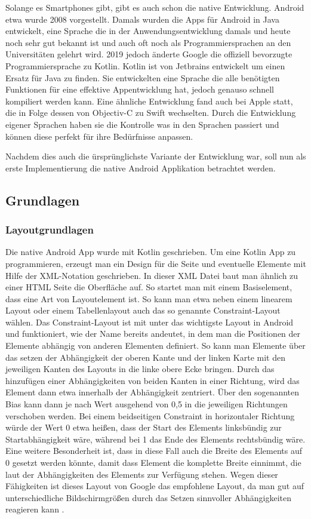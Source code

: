 Solange es Smartphones gibt, gibt es auch schon die native Entwicklung. Android etwa wurde 2008 vorgestellt. Damals wurden die Apps für Android in Java entwickelt, eine Sprache die in der Anwendungsentwicklung damals und heute noch sehr gut bekannt ist und auch oft noch als Programmiersprachen an den Universitäten gelehrt wird. 2019 jedoch änderte Google die offiziell bevorzugte Programmiersprache zu Kotlin. Kotlin ist von Jetbrains entwickelt um einen Ersatz für Java zu finden. Sie entwickelten eine Sprache die alle benötigten Funktionen für eine effektive Appentwicklung hat, jedoch genauso schnell kompiliert werden kann. Eine ähnliche Entwicklung fand auch bei Apple statt, die in Folge dessen von Objectiv-C zu Swift wechselten. Durch die Entwicklung eigener Sprachen haben sie die Kontrolle was in den Sprachen passiert und können diese perfekt für ihre Bedürfnisse anpassen.

Nachdem dies auch die ürsprünglichste Variante der Entwicklung war, soll nun als erste Implementierung die native Android Applikation betrachtet werden.

\subsection{Grundlagen}
\subsubsection{Layoutgrundlagen}
Die native Android App wurde mit Kotlin geschrieben. Um eine Kotlin App zu programmieren, erzeugt man ein Design für die Seite und eventuelle Elemente mit Hilfe der XML-Notation geschrieben.
In dieser XML Datei baut man ähnlich zu einer HTML Seite die Oberfläche auf. So startet man mit einem Basiselement, dass eine Art von Layoutelement ist. So kann man etwa neben einem linearem Layout oder einem Tabellenlayout auch das so genannte Constraint-Layout wählen. Das Constraint-Layout ist mit unter das wichtigste Layout in Android und funktioniert, wie der Name bereits andeutet, in dem man die Positionen der Elemente abhängig von anderen Elementen definiert. So kann man Elemente über das setzen der Abhängigkeit der oberen Kante und der linken Karte mit den jeweiligen Kanten des Layouts in die linke obere Ecke bringen. Durch das hinzufügen einer Abhängigkeiten von beiden Kanten in einer Richtung, wird das Element dann etwa innerhalb der Abhängigkeit zentriert. Über den sogenannten Bias kann dann je nach Wert ausgehend von 0,5 in die jeweiligen Richtungen verschoben werden. Bei einem beidseitigen Constraint in horizontaler Richtung würde der Wert 0 etwa heißen, dass der Start des Elements linksbündig zur Startabhängigkeit wäre, während bei 1 das Ende des Elements rechtsbündig wäre. Eine weitere Besonderheit ist, dass in diese Fall auch die Breite des Elements auf 0 gesetzt werden könnte, damit dass Element die komplette Breite einnimmt, die laut der Abhängigkeiten des Elements zur Verfügung stehen. Wegen dieser Fähigkeiten ist dieses Layout von Google das empfohlene Layout, da man gut auf unterschiedliche Bildschirmgrößen durch das Setzen sinnvoller Abhängigkeiten reagieren kann \cite{Google_Constraint_Layout}.

